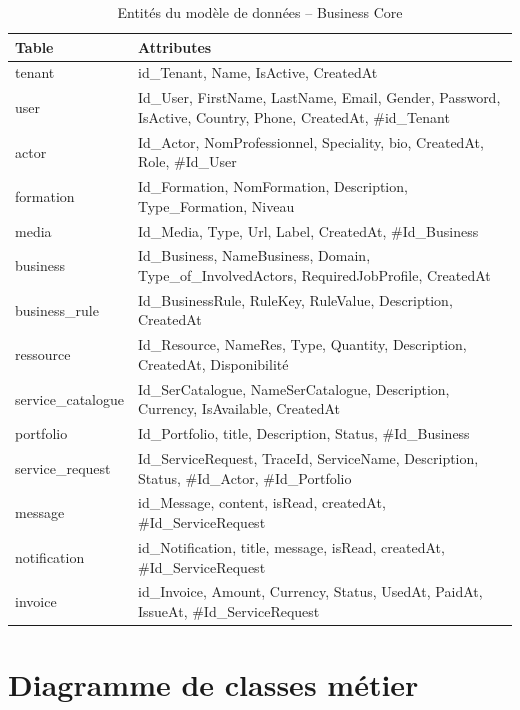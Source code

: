 \begin{table}[h]
\centering
\caption{Entités du modèle de données – Business Core}
\label{tab:entites_business_core}
\begin{tabular}{|p{4cm}|p{12cm}|}
\hline
\textbf{Table} & \textbf{Attributes} \\
\hline
tenant & id\_Tenant, Name, IsActive, CreatedAt \\
\hline
user & Id\_User, FirstName, LastName, Email, Gender, Password, IsActive, Country, Phone, CreatedAt, \#id\_Tenant \\
\hline
actor & Id\_Actor, NomProfessionnel, Speciality, bio, CreatedAt, Role, \#Id\_User \\
\hline
formation & Id\_Formation, NomFormation, Description, Type\_Formation, Niveau \\
\hline
media & Id\_Media, Type, Url, Label, CreatedAt, \#Id\_Business \\
\hline
business & Id\_Business, NameBusiness, Domain, Type\_of\_InvolvedActors, RequiredJobProfile, CreatedAt \\
\hline
business\_rule & Id\_BusinessRule, RuleKey, RuleValue, Description, CreatedAt \\
\hline
ressource & Id\_Resource, NameRes, Type, Quantity, Description, CreatedAt, Disponibilité \\
\hline
service\_catalogue & Id\_SerCatalogue, NameSerCatalogue, Description, Currency, IsAvailable, CreatedAt \\
\hline
portfolio & Id\_Portfolio, title, Description, Status, \#Id\_Business \\
\hline
service\_request & Id\_ServiceRequest, TraceId, ServiceName, Description, Status, \#Id\_Actor, \#Id\_Portfolio \\
\hline
message & id\_Message, content, isRead, createdAt, \#Id\_ServiceRequest \\
\hline
notification & id\_Notification, title, message, isRead, createdAt, \#Id\_ServiceRequest \\
\hline
invoice & id\_Invoice, Amount, Currency, Status, UsedAt, PaidAt, IssueAt, \#Id\_ServiceRequest \\
\hline
\end{tabular}
\end{table}

\section{Diagramme de classes métier}

